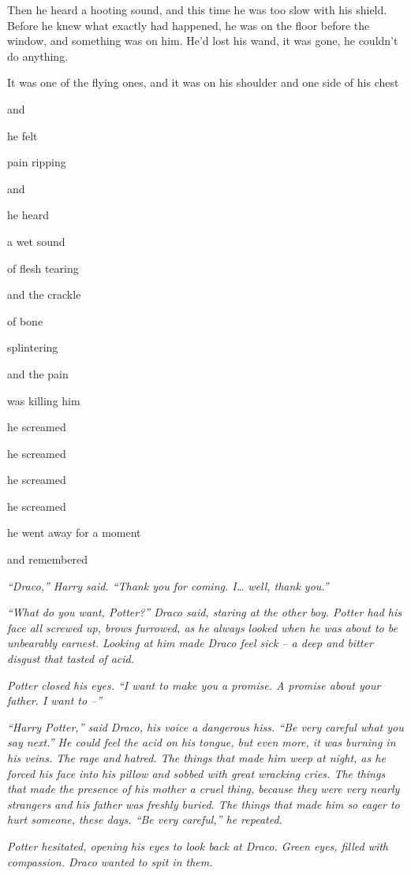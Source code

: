 Then he heard a hooting sound, and this time he was too slow with his
shield. Before he knew what exactly had happened, he was on the floor
before the window, and something was on him. He'd lost his wand, it was
gone, he couldn't do anything.

It was one of the flying ones, and it was on his shoulder and one side
of his chest

and

he felt

pain ripping

and

he heard

a wet sound

of flesh tearing

and the crackle

of bone

splintering

and the pain

was killing him

he screamed

he screamed

he screamed

he screamed

he went away for a moment

and remembered

\emph{``Draco,'' Harry said. ``Thank you for coming. I\ldots{} well,
thank you.''}

\emph{``What do you want, Potter?'' Draco said, staring at the other
boy. Potter had his face all screwed up, brows furrowed, as he always
looked when he was about to be unbearably earnest. Looking at him made
Draco feel sick -- a deep and bitter disgust that tasted of acid.}

\emph{Potter closed his eyes. ``I want to make you a promise. A promise
about your father. I want to --''}

\emph{``Harry Potter,'' said Draco, his voice a dangerous hiss. ``Be
very careful what you say next.'' He could feel the acid on his tongue,
but even more, it was burning in his veins. The rage and hatred. The
things that made him weep at night, as he forced his face into his
pillow and sobbed with great wracking cries. The things that made the
presence of his mother a cruel thing, because they were very nearly
strangers and his father was freshly buried. The things that made him so
eager to hurt someone, these days. ``Be very careful,'' he repeated.}

\emph{Potter hesitated, opening his eyes to look back at Draco. Green
eyes, filled with compassion. Draco wanted to spit in them.}

